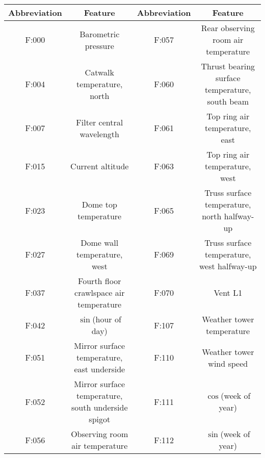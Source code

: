 \begin{figure*}
\begin{tabular}{cccc}
\bottomrule
\end{tabular}
\fi
\begin{tabular}{cccc}
\toprule
Abbreviation &                                        Feature & Abbreviation &                                      Feature \\
\midrule
       F:000 &                             Barometric pressure &          F:057 &           Rear observing room air temperature \\
       F:004 &                        Catwalk temperature, north &         F:060 &      Thrust bearing surface temperature, south beam \\
       F:007 &                                 Filter central wavelength &         F:061 &                Top ring air temperature, east \\
       F:015 &                                     Current altitude &         F:063 &                     Top ring air temperature, west \\
       F:023 &                             Dome top temperature &         F:065 &         Truss surface temperature, north halfway-up \\
       F:027 &                        Dome wall temperature, west &         F:069 &          Truss surface temperature, west halfway-up \\
       F:037 &           Fourth floor crawlspace air temperature &         F:070 &                                   Vent L1 \\
       F:042 &                                $\sin$(hour of day) &         F:107 &                      Weather tower temperature \\
       F:051 &         Mirror surface temperature, east underside &         F:110 &                    Weather tower wind speed \\
       F:052 &  Mirror surface temperature, south underside spigot &         F:111 &                              $\cos$(week of year) \\
       F:056 &                   Observing room air temperature &         F:112 &                              $\sin$(week of year) \\
\bottomrule
\end{tabular}
\label{tab:attribution_features}
\end{figure*}

